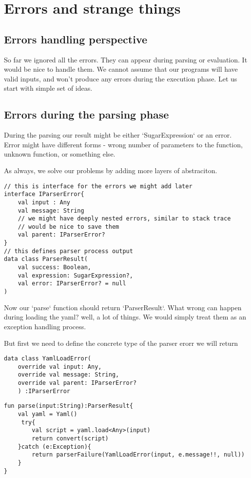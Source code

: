 \documentclass[11pt]{article}
\begin{document}
\section{Errors and strange things}
\label{sec:orgcb88bab}
\subsection{Errors handling perspective}
\label{sec:org0cea123}
So far we ignored all the errors. They can appear during parsing or evaluation.
It would be nice to handle them. We cannot assume that our programs will have valid inputs, and won't produce any errors during the execution phase.
Let us start with simple set of ideas.
\subsection{Errors during the parsing phase}
\label{sec:orgd273efe}
During the parsing our result might be either `SugarExpression` or an error.
Error might have different forms - wrong number of parameters to the function, unknown function, or something else.

As always, we solve our problems by adding more layers of abstraciton.

\begin{verbatim}
// this is interface for the errors we might add later
interface IParserError{
    val input : Any
    val message: String
    // we might have deeply nested errors, similar to stack trace
    // would be nice to save them
    val parent: IParserError?
}
// this defines parser process output
data class ParserResult(
    val success: Boolean,
    val expression: SugarExpression?,
    val error: IParserError? = null
)
\end{verbatim}

Now our `parse` function should return `ParserResult`.
What wrong can happen during loading the yaml? well, a lot of things.
We would simply treat them as an exception handling process.

But first we need to define the concrete type of the parser erorr we will return
\begin{verbatim}
data class YamlLoadError(
    override val input: Any,
    override val message: String,
    override val parent: IParserError?
    ) :IParserError
\end{verbatim}

\begin{verbatim}
fun parse(input:String):ParserResult{
    val yaml = Yaml()
     try{
        val script = yaml.load<Any>(input)
        return convert(script)
    }catch (e:Exception){
        return parserFailure(YamlLoadError(input, e.message!!, null))
    }
}
\end{verbatim}
\end{document}
